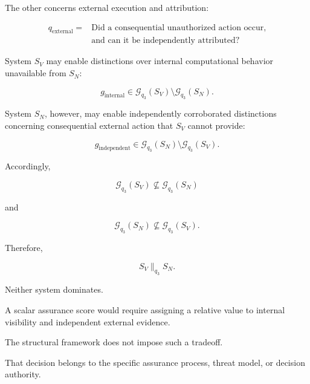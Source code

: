 The other concerns external execution and attribution:

\begin{equation}
  \begin{aligned}
    q_{\mathrm{external}} ={} & \text{Did a consequential unauthorized action occur,} \\
                              & \text{and can it be independently attributed?}
  \end{aligned}
\end{equation}

System \(S_V\) may enable distinctions over internal computational
behavior unavailable from \(S_N\):

\begin{equation}
  g_{\mathrm{internal}}
  \in
  \mathcal{G}_{q_3}(S_V)
  \setminus
  \mathcal{G}_{q_3}(S_N).
\end{equation}

System \(S_N\), however, may enable independently corroborated
distinctions concerning consequential external action that \(S_V\)
cannot provide:

\begin{equation}
  g_{\mathrm{independent}}
  \in
  \mathcal{G}_{q_3}(S_N)
  \setminus
  \mathcal{G}_{q_3}(S_V).
\end{equation}

Accordingly,

\begin{equation}
  \mathcal{G}_{q_3}(S_V)
  \nsubseteq
  \mathcal{G}_{q_3}(S_N)
\end{equation}

and

\begin{equation}
  \mathcal{G}_{q_3}(S_N)
  \nsubseteq
  \mathcal{G}_{q_3}(S_V).
\end{equation}

Therefore,

\begin{equation}
  S_V
  \parallel_{q_3}
  S_N.
  \label{eq:case3-incomparable}
\end{equation}

Neither system dominates.

A scalar assurance score would require assigning a relative value
to internal visibility and independent external evidence.

The structural framework does not impose such a tradeoff.

That decision belongs to the specific assurance process, threat model,
or decision authority.

